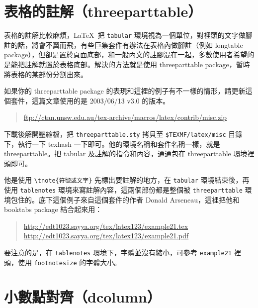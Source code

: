 \section{表格的註解（threeparttable）}
\label{sec:3parttable}

表格的註解比較麻煩，\LaTeX\ 把 \texttt{tabular} 環境視為一個單位，對裡頭的文字做腳註的話，將會不翼而飛，有些巨集套件有辦法在表格內做腳註（例如 \textsf{longtable} package），但卻是置於頁面底部，和一般內文的註腳混在一起，多數使用者希望的是能把註解就置於表格底部。解決的方法就是使用 \textsf{threeparttable} package，暫時將表格的某部份分割出來。

如果你的 \textsf{threeparttable} package 的表現和這裡的例子有不一樣的情形，請更新這個套件，這篇文章使用的是 2003/06/13 v3.0 的版本。

\begin{quote}
  \url{ftp://ctan.unsw.edu.au/tex-archive/macros/latex/contrib/misc.zip}
\end{quote}

下載後解開壓縮檔，把 \texttt{threeparttable.sty} 拷貝至 \texttt{\$TEXMF/latex/misc} 目錄下，執行一下 {\ttfamily texhash} 一下即可。他的環境名稱和套件名稱一樣，就是 {\ttfamily threeparttable}。把 {\ttfamily tabular} 及註解的指令和內容，通通包在 {\ttfamily threeparttable} 環境裡頭即可。

他是使用 \verb|\tnote{符號或文字}| 先標出要註解的地方，在 \texttt{tabular} 環境結束後，再使用 \texttt{tablenotes} 環境來寫註解內容，這兩個部份都是整個被 \texttt{threeparttable} 環境包住的。底下這個例子來自這個套件的作者 Donald Arseneau，這裡把他和 \textsf{booktabs} package 結合起來用：

\begin{quote}
  \url{http://edt1023.sayya.org/tex/latex123/example21.tex}\\
  \url{http://edt1023.sayya.org/tex/latex123/example21.pdf}
\end{quote}

要注意的是，在 \texttt{tablenotes} 環境下，字體並沒有縮小，可參考 \texttt{example21} 裡頭，使用 \texttt{footnotesize} 的字體大小。

\section{小數點對齊（dcolumn）}
\label{sec:dcolumn}

